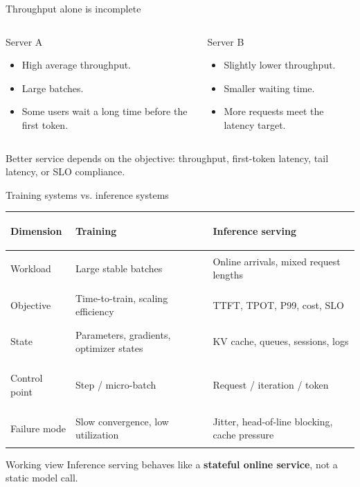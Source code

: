 \documentclass[aspectratio=169,11pt]{beamer}
\newcommand{\key}[1]{\textcolor{HUSTDeep}{\textbf{#1}}}
\begin{document}
\begin{frame}{Throughput alone is incomplete}
  \begin{columns}[T,totalwidth=\textwidth]
    \begin{column}{0.48\textwidth}
      \begin{block}{Server A}
        \begin{itemize}
          \item High average throughput.
          \item Large batches.
          \item Some users wait a long time before the first token.
        \end{itemize}
      \end{block}
    \end{column}
    \begin{column}{0.48\textwidth}
      \begin{block}{Server B}
        \begin{itemize}
          \item Slightly lower throughput.
          \item Smaller waiting time.
          \item More requests meet the latency target.
        \end{itemize}
      \end{block}
    \end{column}
  \end{columns}
  \vspace{0.35cm}
  \centering
  \large Better service depends on the objective: throughput, first-token latency, tail latency, or SLO compliance.
\end{frame}

\begin{frame}{Training systems vs. inference systems}
  \footnotesize
  \begin{tabularx}{\textwidth}{>{\bfseries\raggedright\arraybackslash}p{2.0cm}YY}
    \toprule
    Dimension & Training & Inference serving \\
    \midrule
    Workload & Large stable batches & Online arrivals, mixed request lengths \\
    Objective & Time-to-train, scaling efficiency & TTFT, TPOT, P99, cost, SLO \\
    State & Parameters, gradients, optimizer states & KV cache, queues, sessions, logs \\
    Control point & Step / micro-batch & Request / iteration / token \\
    Failure mode & Slow convergence, low utilization & Jitter, head-of-line blocking, cache pressure \\
    \bottomrule
  \end{tabularx}
  \vspace{0.12cm}
  \begin{block}{Working view}
    Inference serving behaves like a \key{stateful online service}, not a static model call.
  \end{block}
\end{frame}
\end{document}
